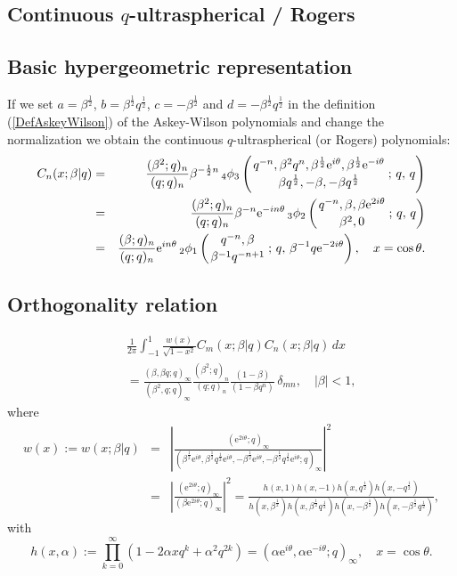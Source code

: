 \documentclass[envcountchap,graybox]{svmono}
\newcommand{\qhyp}[5]{\mbox{}_{#1}{\phi}_{#2}
\left(\genfrac{}{}{0pt}{}{#3}{#4}\,;\,q,\,#5\right)}
\newcommand{\e}{\textrm{e}}
\begin{document}
\subsection{Continuous $q$-ultraspherical / Rogers}
\par

\subsection*{Basic hypergeometric representation} If we set $a=\beta^{\frac{1}{2}}$, $b=\beta^{\frac{1}{2}}q^{\frac{1}{2}}$,
$c=-\beta^{\frac{1}{2}}$ and $d=-\beta^{\frac{1}{2}}q^{\frac{1}{2}}$ in the definition
(\ref{DefAskeyWilson}) of the Askey-Wilson polynomials and change the
normalization we obtain the continuous $q$-ultraspherical (or Rogers) polynomials:
\begin{eqnarray}
\label{DefContqUltra}
C_n(x;\beta|q)&=&\frac{(\beta^2;q)_n}{(q;q)_n}\beta^{-\frac{1}{2}n}\,\qhyp{4}{3}{q^{-n},\beta^2q^n,
\beta^{\frac{1}{2}}\e^{i\theta},\beta^{\frac{1}{2}}\e^{-i\theta}}{\beta q^{\frac{1}{2}},
-\beta,-\beta q^{\frac{1}{2}}}{q}\\
&=&\frac{(\beta^2;q)_n}{(q;q)_n}\beta^{-n}\e^{-in\theta}\,\qhyp{3}{2}{q^{-n},\beta,\beta\e^{2i\theta}}
{\beta^2,0}{q}\nonumber\\
&=&\frac{(\beta;q)_n}{(q;q)_n}\e^{in\theta}\,\qhyp{2}{1}{q^{-n},\beta}{\beta^{-1}q^{-n+1}}{\beta^{-1}q\e^{-2i\theta}},
\quad x=\cos\theta.\nonumber
\end{eqnarray}

\subsection*{Orthogonality relation}
\begin{eqnarray}
\label{OrtContqUltra}
& &\frac{1}{2\pi}\int_{-1}^1\frac{w(x)}{\sqrt{1-x^2}}C_m(x;\beta|q)C_n(x;\beta|q)\,dx\nonumber\\
& &{}=\frac{(\beta,\beta q;q)_{\infty}}{(\beta^2,q;q)_{\infty}}
\frac{(\beta^2;q)_n}{(q;q)_n}\frac{(1-\beta)}{(1-\beta q^n)}\,\delta_{mn},\quad|\beta|<1,
\end{eqnarray}
where
\begin{eqnarray*}
w(x):=w(x;\beta|q)&=&\left|\frac{(\e^{2i\theta};q)_{\infty}}
{(\beta^{\frac{1}{2}}\e^{i\theta},\beta^{\frac{1}{2}}q^{\frac{1}{2}}\e^{i\theta},
-\beta^{\frac{1}{2}}\e^{i\theta},-\beta^{\frac{1}{2}}q^{\frac{1}{2}}\e^{i\theta};q)_{\infty}}\right|^2\\
&=&\left|\frac{(\e^{2i\theta};q)_{\infty}}{(\beta\e^{2i\theta};q)_{\infty}}\right|^2
=\frac{h(x,1)h(x,-1)h(x,q^{\frac{1}{2}})h(x,-q^{\frac{1}{2}})}
{h(x,\beta^{\frac{1}{2}})h(x,\beta^{\frac{1}{2}}q^{\frac{1}{2}})
h(x,-\beta^{\frac{1}{2}})h(x,-\beta^{\frac{1}{2}}q^{\frac{1}{2}})},
\end{eqnarray*}
with
$$h(x,\alpha):=\prod_{k=0}^{\infty}\left(1-2\alpha xq^k+\alpha^2q^{2k}\right)
=\left(\alpha\e^{i\theta},\alpha\e^{-i\theta};q\right)_{\infty},\quad x=\cos\theta.$$
\end{document}

